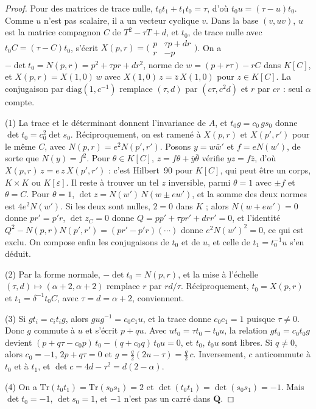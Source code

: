\begin{proof}
Pour des matrices de trace nulle, $t_0t_1 + t_1t_0 = \tau$, d'où $t_0 u = (\tau - u) t_0$. Comme $u$ n'est pas scalaire, il a un vecteur cyclique $v$. Dans la base $(v, uv)$, $u$ est la matrice compagnon $C$ de $T^2 - \tau T + d$, et $t_0$, de trace nulle avec $t_0 C = (\tau - C)t_0$, s'écrit $X(p, r) = \bigl(\begin{smallmatrix} p & \tau p + dr \\ r & -p \end{smallmatrix}\bigr)$. On a $-\det t_0 = N(p, r) = p^2 + \tau pr + dr^2$, norme de $w = (p + r\tau) - rC$ dans $K[C]$, et $X(p, r) = X(1, 0)\,w$ avec $X(1, 0)\,z = \bar z\, X(1, 0)$ pour $z \in K[C]$. La conjugaison par $\mathrm{diag}(1, c^{-1})$ remplace $(\tau, d)$ par $(c\tau, c^2d)$ et $r$ par $cr$ : seul $\alpha$ compte.

(1) La trace et le déterminant donnent l'invariance de $A$, et $t_0 g = c_0\, g s_0$ donne $\det t_0 = c_0^2 \det s_0$. Réciproquement, on est ramené à $X(p, r)$ et $X(p', r')$ pour le même $C$, avec $N(p, r) = e^2 N(p', r')$. Posons $y = w\bar w'$ et $f = eN(w')$, de sorte que $N(y) = f^2$. Pour $\theta \in K[C]$, $z = f\theta + \bar y\bar\theta$ vérifie $yz = f\bar z$, d'où $X(p, r)\,z = e\, z\, X(p', r')$ : c'est Hilbert~90 pour $K[C]$, qui peut être un corps, $K \times K$ ou $K[\varepsilon]$. Il reste à trouver un tel $z$ inversible, parmi $\theta = 1$ avec $\pm f$ et $\theta = C$. Pour $\theta = 1$, $\det z = N(w')\,N(w \pm e w')$, et la somme des deux normes est $4e^2N(w')$. Si les deux sont nulles, $2 = 0$ dans $K$ ; alors $N(w + ew') = 0$ donne $pr' = p'r$, $\det z_C = 0$ donne $Q = pp' + \tau pr' + drr' = 0$, et l'identité $Q^2 - N(p, r)N(p', r') = (pr' - p'r)(\cdots)$ donne $e^2N(w')^2 = 0$, ce qui est exclu. On compose enfin les conjugaisons de $t_0$ et de $u$, et celle de $t_1 = t_0^{-1}u$ s'en déduit.

(2) Par la forme normale, $-\det t_0 = N(p, r)$, et la mise à l'échelle $(\tau, d) \mapsto (\alpha + 2, \alpha + 2)$ remplace $r$ par $rd/\tau$. Réciproquement, $t_0 = X(p, r)$ et $t_1 = \delta^{-1} t_0 C$, avec $\tau = d = \alpha + 2$, conviennent.

(3) Si $g t_i = c_i t_i g$, alors $g u g^{-1} = c_0 c_1 u$, et la trace donne $c_0 c_1 = 1$ puisque $\tau \neq 0$. Donc $g$ commute à $u$ et s'écrit $p + qu$. Avec $u t_0 = \tau t_0 - t_0 u$, la relation $g t_0 = c_0 t_0 g$ devient $(p + q\tau - c_0 p)\,t_0 - (q + c_0 q)\,t_0 u = 0$, et $t_0$, $t_0 u$ sont libres. Si $q \neq 0$, alors $c_0 = -1$, $2p + q\tau = 0$ et $g = \frac q2(2u - \tau) = \frac q2\, c$. Inversement, $c$ anticommute à $t_0$ et à $t_1$, et $\det c = 4d - \tau^2 = d(2 - \alpha)$.

(4) On a $\mathrm{Tr}(t_0t_1) = \mathrm{Tr}(s_0s_1) = 2$ et $\det(t_0t_1) = \det(s_0s_1) = -1$. Mais $\det t_0 = -1$, $\det s_0 = 1$, et $-1$ n'est pas un carré dans $\mathbf Q$.
\end{proof}


